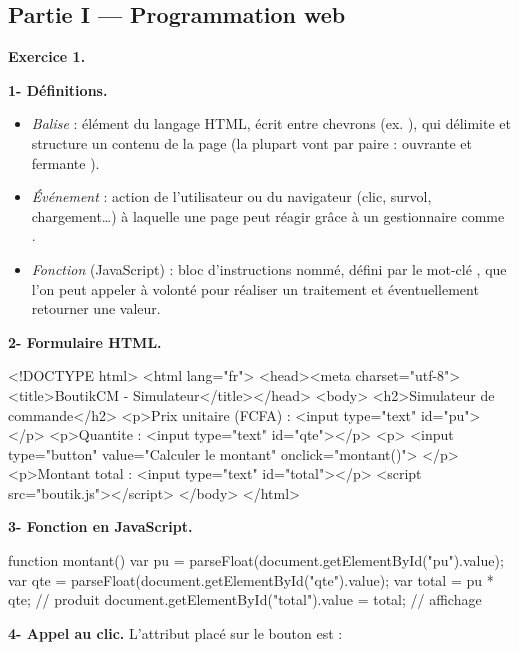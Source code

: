
\subsection*{Partie I — Programmation web}

\textbf{Exercice 1.}

\smallskip
\textbf{1- Définitions.}
\begin{itemize}
\item \emph{Balise} : élément du langage HTML, écrit entre chevrons (ex. ),
qui délimite et structure un contenu de la page (la plupart vont par paire :
ouvrante  et fermante ).
\item \emph{Événement} : action de l'utilisateur ou du navigateur (clic, survol,
chargement…) à laquelle une page peut réagir grâce à un gestionnaire comme .
\item \emph{Fonction} (JavaScript) : bloc d'instructions nommé, défini par le mot-clé
, que l'on peut appeler à volonté pour réaliser un traitement et
éventuellement retourner une valeur.
\end{itemize}

\textbf{2- Formulaire HTML.}

\begin{codehtml}
<!DOCTYPE html>
<html lang="fr">
<head><meta charset="utf-8"><title>BoutikCM - Simulateur</title></head>
<body>
  <h2>Simulateur de commande</h2>
  <p>Prix unitaire (FCFA) : <input type="text" id="pu"></p>
  <p>Quantite : <input type="text" id="qte"></p>
  <p>
    <input type="button" value="Calculer le montant" onclick="montant()">
  </p>
  <p>Montant total : <input type="text" id="total"></p>
  <script src="boutik.js"></script>
</body>
</html>
\end{codehtml}

\textbf{3- Fonction  en JavaScript.}

\begin{codejs}
function montant() {
  var pu  = parseFloat(document.getElementById("pu").value);
  var qte = parseFloat(document.getElementById("qte").value);
  var total = pu * qte;                                  // produit
  document.getElementById("total").value = total;        // affichage
}
\end{codejs}

\textbf{4- Appel au clic.} L'attribut placé sur le bouton est :

